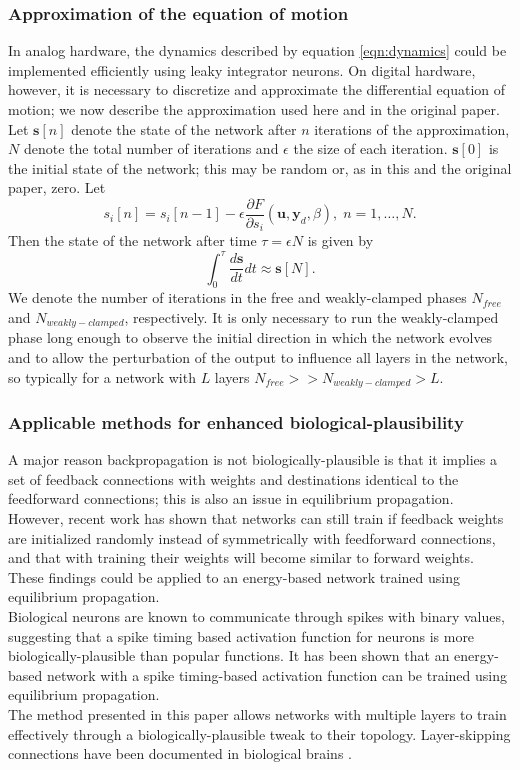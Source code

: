 \documentclass{article}
\newcommand{\mtx}[1]{\bm{#1}}
\newcommand{\npar}{\\\indent}
\begin{document}
\subsubsection{Approximation of the equation of motion}

In analog hardware, the dynamics described by equation \ref{eqn:dynamics} could be implemented efficiently using leaky integrator neurons. On digital hardware, however, it is necessary to discretize and approximate the differential equation of motion; we now describe the approximation used here and in the original paper. Let $\mtx{s}[n]$ denote the state of the network after $n$ iterations of the approximation, $N$ denote the total number of iterations and $\epsilon$ the size of each iteration. $\mtx{s}[0]$ is the initial state of the network; this may be random or, as in this and the original paper, zero.  Let 
 \begin{equation}
 s_i[n]=s_i[n-1]-\epsilon \frac{\partial F}{\partial s_i}(\mtx{u},\mtx{y}_d,\beta),\;n=1,\hdots,N.
 \end{equation}
 Then the state of the network after time $\tau=\epsilon N$ is given by
\begin{equation}
\int_0^\tau\frac{d\mtx{s}}{dt}dt\approx \mtx{s}[N].
\end{equation}
 We denote the number of iterations in the free and weakly-clamped phases $N_{free}$ and $N_{weakly-clamped}$, respectively. It is only necessary to run the weakly-clamped phase long enough to observe the initial direction in which the network evolves and to allow the perturbation of the output to influence all layers in the network, so typically for a network with $L$ layers $N_{free}>>N_{weakly-clamped}>L$.
 
\subsubsection{Applicable methods for enhanced biological-plausibility}

A major reason backpropagation is not biologically-plausible is that it implies a set of feedback connections with weights and destinations identical to the feedforward connections; this is also an issue in equilibrium propagation. However, recent work \cite{lillicrap2014} has shown that networks can still train if feedback weights are initialized randomly instead of symmetrically with feedforward connections, and that with training their weights will become similar to forward weights. These findings could be applied to an energy-based network trained using equilibrium propagation.
\npar
Biological neurons are known to communicate through spikes with binary values, suggesting that a spike timing based activation function for neurons is more biologically-plausible than popular functions. It has been shown \cite{oconnor2018} that an energy-based network with a spike timing-based activation function can be trained using equilibrium propagation.
\npar
The method presented in this paper allows networks with multiple layers to train effectively through a biologically-plausible tweak to their topology. Layer-skipping connections have been documented in biological brains \cite{bullmore2009}.
\end{document}

